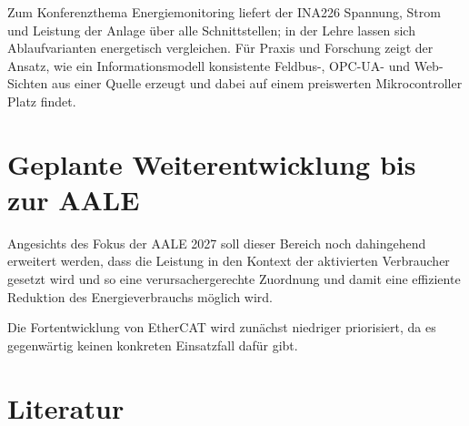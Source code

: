 \documentclass[]{article}%
\begin{document}
Zum Konferenzthema Energiemonitoring liefert der INA226 Spannung, Strom und Leistung der Anlage über alle Schnittstellen; in der Lehre lassen sich Ablaufvarianten energetisch vergleichen. Für Praxis und Forschung zeigt der Ansatz, wie ein Informationsmodell konsistente Feldbus-, OPC-UA- und Web-Sichten aus einer Quelle erzeugt und dabei auf einem preiswerten Mikrocontroller Platz findet.

\section{Geplante Weiterentwicklung bis zur AALE}
Angesichts des Fokus der AALE 2027 soll dieser Bereich noch dahingehend erweitert werden, dass die Leistung in den Kontext der aktivierten Verbraucher gesetzt wird und so eine verursachergerechte Zuordnung und damit eine effiziente Reduktion des Energieverbrauchs möglich wird.

Die Fortentwicklung von EtherCAT wird zunächst niedriger priorisiert, da es gegenwärtig keinen konkreten Einsatzfall dafür gibt.

\section{Literatur}



\end{document}
